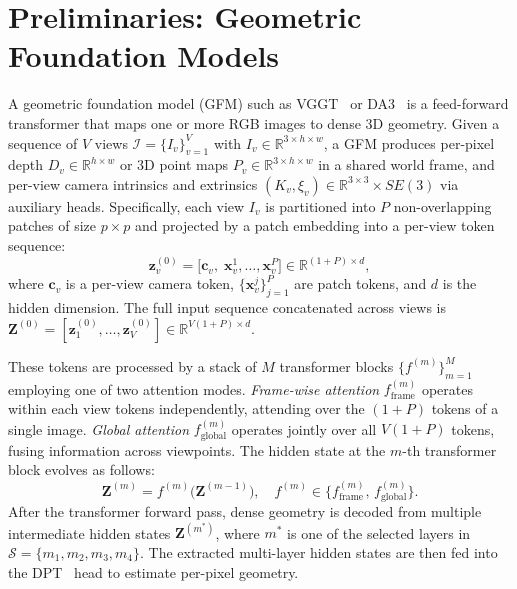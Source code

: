 


\section{Preliminaries: Geometric Foundation Models}
\label{sec:prelim}

A geometric foundation model (GFM) such as VGGT~\citep{wang2025vggt} or DA3~\citep{lin2025depth} is a feed-forward transformer that maps one or more RGB images to dense 3D geometry. Given a sequence of $V$ views $\mathcal{I} = \{I_v\}_{v=1}^{V}$ with $I_v \in \mathbb{R}^{3 \times h \times w}$, a GFM produces per-pixel depth $D_v \in \mathbb{R}^{h \times w}$ or 3D point maps $P_v \in \mathbb{R}^{3 \times h \times w}$ in a shared world frame, and per-view camera intrinsics and extrinsics $(K_v, \xi_v) \in \mathbb{R}^{3\times 3} \times SE(3)$ via auxiliary heads.
Specifically, each view $I_v$ is partitioned into $P$ non-overlapping patches of size $p \times p$ and projected by a patch embedding into a per-view token sequence:
\begin{equation}
    \mathbf{z}_v^{(0)} = \big[\mathbf{c}_v,\; \mathbf{x}_v^1, \ldots, \mathbf{x}_v^{P}\big] \in \mathbb{R}^{(1+P) \times d},
\end{equation}
where $\mathbf{c}_v$ is a per-view camera token, $\{\mathbf{x}_v^j\}_{j=1}^{P}$ are patch tokens, and $d$ is the hidden dimension. The full input sequence concatenated across views is $\mathbf{Z}^{(0)} = [\mathbf{z}_1^{(0)}, \ldots, \mathbf{z}_V^{(0)}] \in \mathbb{R}^{V(1+P) \times d}$.

These tokens are processed by a stack of $M$ transformer blocks $\{{f^{(m)}}\} _{m=1}^M$ employing one of two attention modes. \emph{Frame-wise attention} $f_{\text{frame}}^{(m)}$ operates within each view tokens independently, attending over the $(1+P)$ tokens of a single image. \emph{Global attention} $f_{\text{global}}^{(m)}$ operates jointly over all $V (1+P)$ tokens, fusing information across viewpoints. The hidden state at the $m$-th transformer block evolves as follows:
\begin{equation}
    \mathbf{Z}^{(m)} = f^{(m)}\big(\mathbf{Z}^{(m-1)}\big), \quad f^{(m)} \in \{f_{\text{frame}}^{(m)},\, f_{\text{global}}^{(m)}\}.
\end{equation}
After the transformer forward pass, dense geometry is decoded from multiple intermediate hidden states $\mathbf{Z}^{(m^*)}$, where $m^*$ is one of the selected layers in $\mathcal{S}=\{m_1,m_2,m_3,m_4\}$. The extracted multi-layer hidden states are then fed into the DPT~\cite{ranftl2021vision} head to estimate per-pixel geometry.

